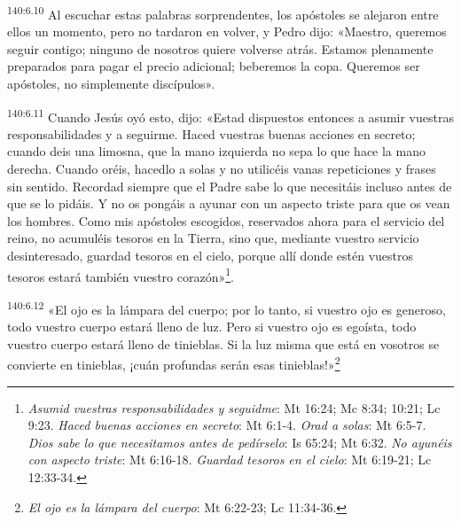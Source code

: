 \par
\textsuperscript{140:6.10} Al escuchar estas palabras sorprendentes, los apóstoles se alejaron entre ellos un momento, pero no tardaron en volver, y Pedro dijo: «Maestro, queremos seguir contigo; ninguno de nosotros quiere volverse atrás. Estamos plenamente preparados para pagar el precio adicional; beberemos la copa. Queremos ser apóstoles, no simplemente discípulos».

\par
\textsuperscript{140:6.11} Cuando Jesús oyó esto, dijo: «Estad dispuestos entonces a asumir vuestras responsabilidades y a seguirme. Haced vuestras buenas acciones en secreto; cuando deis una limosna, que la mano izquierda no sepa lo que hace la mano derecha. Cuando oréis, hacedlo a solas y no utilicéis vanas repeticiones y frases sin sentido. Recordad siempre que el Padre sabe lo que necesitáis incluso antes de que se lo pidáis. Y no os pongáis a ayunar con un aspecto triste para que os vean los hombres. Como mis apóstoles escogidos, reservados ahora para el servicio del reino, no acumuléis tesoros en la Tierra, sino que, mediante vuestro servicio desinteresado, guardad tesoros en el cielo, porque allí donde estén vuestros tesoros estará también vuestro corazón»\footnote{\textit{Asumid vuestras responsabilidades y seguidme}: Mt 16:24; Mc 8:34; 10:21; Lc 9:23. \textit{Haced buenas acciones en secreto}: Mt 6:1-4. \textit{Orad a solas}: Mt 6:5-7. \textit{Dios sabe lo que necesitamos antes de pedírselo}: Is 65:24; Mt 6:32. \textit{No ayunéis con aspecto triste}: Mt 6:16-18. \textit{Guardad tesoros en el cielo}: Mt 6:19-21; Lc 12:33-34.}.

\par
\textsuperscript{140:6.12} «El ojo es la lámpara del cuerpo; por lo tanto, si vuestro ojo es generoso, todo vuestro cuerpo estará lleno de luz. Pero si vuestro ojo es egoísta, todo vuestro cuerpo estará lleno de tinieblas. Si la luz misma que está en vosotros se convierte en tinieblas, ¡cuán profundas serán esas tinieblas!»\footnote{\textit{El ojo es la lámpara del cuerpo}: Mt 6:22-23; Lc 11:34-36.}

